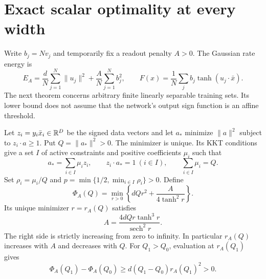 \section{Exact scalar optimality at every width}

Write $b_j=Nv_j$ and temporarily fix a readout penalty $A>0$.
The Gaussian rate energy is
\begin{equation}\label{eq:energy}
 E_A=\frac dN\sum_{j=1}^N\|u_j\|^2+\frac AN\sum_{j=1}^Nb_j^2,
 \qquad F(x)=\frac1N\sum_jb_j\tanh(u_j\cdot\bar x).
\end{equation}
The next theorem concerns arbitrary finite linearly separable training
sets. Its lower bound does not assume that the network's output sign
function is an affine threshold.

Let $z_i=y_i\bar x_i\in\mathbb R^D$ be the signed data vectors and let $a_*$
minimize $\|a\|^2$ subject to $z_i\cdot a\ge1$. Put $Q=\|a_*\|^2>0$.
The minimizer is unique. Its KKT conditions give a set $I$ of active
constraints and positive coefficients $\mu_i$ such that
\begin{equation}\label{eq:kkt}
 a_*=\sum_{i\in I}\mu_i z_i,\qquad
 z_i\cdot a_*=1\ (i\in I),\qquad \sum_{i\in I}\mu_i=Q.
\end{equation}
Set $\rho_i=\mu_i/Q$ and
$p=\min\{1/2,\min_{i\in I}\rho_i\}>0$.
Define
\begin{equation}\label{eq:profile}
 \Phi_A(Q)=\min_{r>0}\left\{dQr^2+\frac{A}{4\tanh^2r}\right\}.
\end{equation}
Its unique minimizer $r=r_A(Q)$ satisfies
\begin{equation}\label{eq:stationary}
 A=\frac{4dQr\tanh^3r}{\operatorname{sech}^2r}.
\end{equation}
The right side is strictly increasing from zero to infinity.
In particular $r_A(Q)$ increases with $A$ and decreases with $Q$.
For $Q_1>Q_0$, evaluation at $r_A(Q_1)$ gives
\begin{equation}\label{eq:profile-gap}
 \Phi_A(Q_1)-\Phi_A(Q_0)
 \ge d(Q_1-Q_0)r_A(Q_1)^2>0.
\end{equation}

